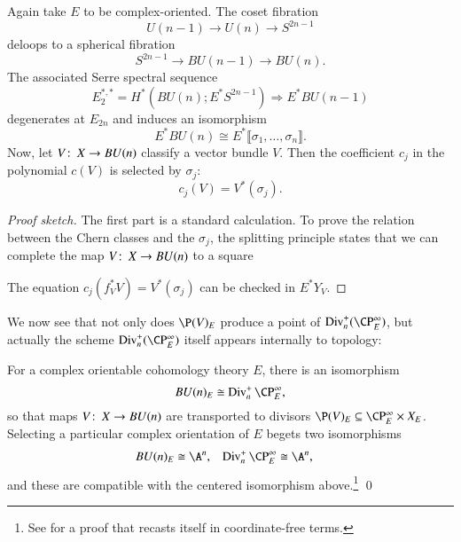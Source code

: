 \begin{theorem}\label{ChernClassesAreSymmInChernRoots}
Again take $E$ to be complex-oriented.  The coset fibration \[U(n-1) \to U(n) \to S^{2n-1}\] deloops to a spherical fibration \[S^{2n-1} \to BU(n-1) \to BU(n).\]  The associated Serre spectral sequence \[E_2^{*, *} = H^*(BU(n); E^* S^{2n-1}) \Rightarrow E^* BU(n-1)\] degenerates at $E_{2n}$ and induces an isomorphism \[E^* BU(n) \cong E^* \llbracket \sigma_1, \ldots, \sigma_n\rrbracket.\]  Now, let $V\colon\thinspace X \to BU(n)$ classify a vector bundle $V$.  Then the coefficient $c_j$ in the polynomial $c(V)$ is selected by $\sigma_j$: \[c_j(V) = V^*(\sigma_j).\]
\end{theorem}
\begin{proof}[Proof sketch]
The first part is a standard calculation.  To prove the relation between the Chern classes and the $\sigma_j$, the splitting principle states that we can complete the map $V\colon\thinspace X \to BU(n)$ to a square
\begin{center}
\end{center}
The equation $c_j(f_V^* V) = V^*(\sigma_j)$ can be checked in $E^* Y_V$.
\end{proof}

We now see that not only does $\P(V)_E$ produce a point of $\Div_n^+(\CP^\infty_E)$, but actually the scheme $\Div_n^+(\CP^\infty_E)$ itself appears internally to topology:

\begin{corollary}\label{IdentificationOfBUnWithDivn}
For a complex orientable cohomology theory $E$, there is an isomorphism \[BU(n)_E \cong \Div_n^+ \CP^\infty_E,\] so that maps $V\colon\thinspace X \to BU(n)$ are transported to divisors $\P(V)_E \subseteq \CP^\infty_E \times X_E$.  Selecting a particular complex orientation of $E$ begets two isomorphisms
\begin{align*}
BU(n)_E & \cong \A^n, &
\Div_n^+ \CP^\infty_E & \cong \A^n,
\end{align*}
and these are compatible with the centered isomorphism above.\footnote{See \cite[Proposition 8.31]{StricklandFSFG} for a proof that recasts  itself in coordinate-free terms.} \qed
\end{corollary}

